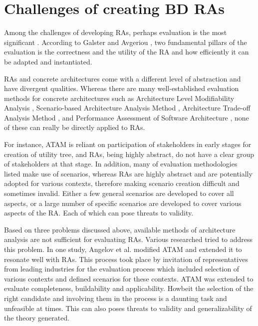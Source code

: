 \documentclass{ieeeaccess}
\begin{document}
\section{Challenges of creating BD RAs}

Among the challenges of developing RAs, perhaps evaluation is the most significant \cite{Maier}. According to Galster and Avgeriou \cite{galster2011empirically}, two fundamental pillars of the evaluation is the correctness and the utility of the RA and how efficiently it can be adapted and instantiated. 

RAs and concrete architectures come with a different level of abstraction and have divergent qualities. Whereas there are many well-established evaluation methods for concrete architectures such as Architecture Level Modifiability Analysis \cite{Bengtsson}, Scenario-based Architecture Analysis Method \cite{kazman1994saam}, Architecture Trade-off Analysis Method \cite{KazmanATAM}, and Performance Assessment of Software Architecture \cite{Williams}, none of these can really be directly applied to RAs. 

For instance, ATAM is reliant on participation of stakeholders in early stages for creation of utility tree, and RAs, being highly abstract, do not have a clear group of stakeholders at that stage. In addition, many of evaluation methodologies listed make use of scenarios, whereas RAs are highly abstract and are potentially adopted for various contexts, therefore making scenario creation difficult and sometimes invalid. Either a few general scenarios are developed to cover all aspects, or a large number of specific scenarios are developed to cover various aspects of the RA. Each of which can pose threats to validity.

Based on three problems discussed above, available methods of architecture analysis are not sufficient for evaluating RAs. Various researched tried to address this problem. In one study, Angelov et al. \cite{angelov2008towards} modified ATAM and extended it to resonate well with RAs. This process took place by invitation of representatives from leading industries for the evaluation process which included selection of various contexts and defined scenarios for these contexts. ATAM was extended to evaluate completeness, buildability and applicability. Howbeit the selection of the right candidate and involving them in the process is a daunting task and unfeasible at times. This can also poses threats to validity and generalizability of the theory generated. 
\end{document}
